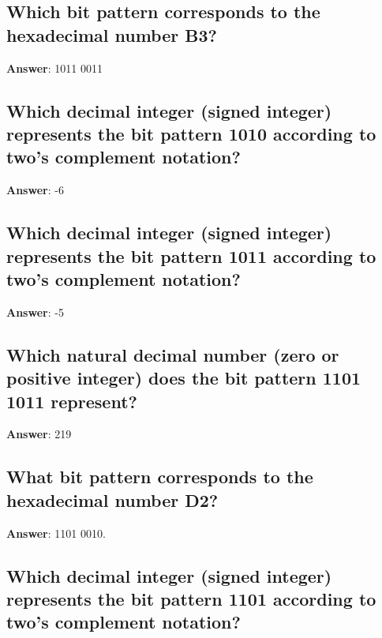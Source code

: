 \documentclass[a4paper,11pt,oneside]{article}
\begin{document}
\begin{sloppypar}
\subsection{Which bit pattern corresponds to the hexadecimal number B3?}

\label{q:376:sa:en:True}

\textbf{Answer}: 1011 0011



\subsection{Which decimal integer (signed integer) represents the bit pattern 1010 according to two{\textquoteright}s complement notation?}

\label{q:377:sa:en:True}

\textbf{Answer}: -6



\subsection{Which decimal integer (signed integer) represents the bit pattern 1011 according to two{\textquoteright}s complement notation?}

\label{q:378:sa:en:True}

\textbf{Answer}: -5



\subsection{Which natural decimal number (zero or positive integer) does the bit pattern 1101 1011 represent?}

\label{q:379:sa:en:True}

\textbf{Answer}: 219



\subsection{What bit pattern corresponds to the hexadecimal number D2?}

\label{q:380:sa:en:True}

\textbf{Answer}: 1101 0010.



\subsection{Which decimal integer (signed integer) represents the bit pattern 1101 according to two{\textquoteright}s complement notation?}


\end{sloppypar}
\end{document}

